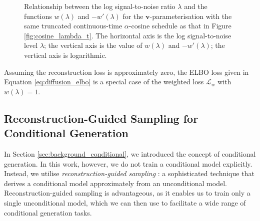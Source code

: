 \documentclass[ oneside,%
                    author={George Herbert},
                    degree={MSci},
                     title={Video Diffusion Models for Climate Simulations},
                  subtitle={}]{dissertation}
\begin{document}
\begin{figure}[htbp]
      \centering
      \caption{Relationship between the log signal-to-noise ratio $\lambda$ and the functions $w(\lambda)$ and $-w'(\lambda)$ for the $\mathbf{v}$-parameterisation with the same truncated continuous-time $\alpha$-cosine schedule as that in Figure \ref{fig:cosine_lambda_t}. The horizontal axis is the log signal-to-noise level $\lambda$; the vertical axis is the value of $w(\lambda)$ and $-w'(\lambda)$; the vertical axis is logarithmic.}
      \label{fig:v_prediction_weighting}
\end{figure}

Assuming the reconstruction loss is approximately zero, the ELBO loss given in Equation \ref{eq:diffusion_elbo} is a special case of the weighted loss $\mathcal{L}_w$ with $w(\lambda) = 1$.

\subsection{Reconstruction-Guided Sampling for Conditional Generation}
\label{sec:background_diffusion_reconstruction_guided_sampling}

In Section \ref{sec:background_conditional}, we introduced the concept of conditional generation. In this work, however, we do not train a conditional model explicitly. Instead, we utilise \textit{reconstruction-guided sampling} \cite{VDM_Ho}: a sophisticated technique that derives a conditional model approximately from an unconditional model. Reconstruction-guided sampling is advantageous, as it enables us to train only a single unconditional model, which we can then use to facilitate a wide range of conditional generation tasks.
\end{document}
